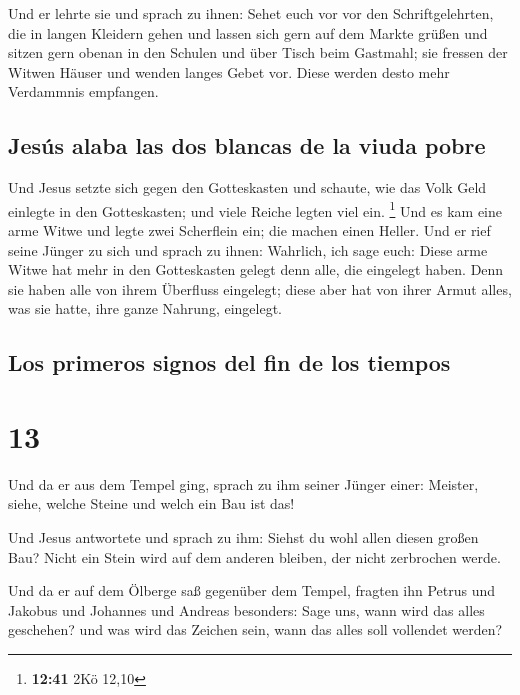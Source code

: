  Und er lehrte sie und sprach zu ihnen: Sehet euch vor
vor den Schriftgelehrten, die in langen Kleidern gehen und lassen sich
gern auf dem Markte grüßen  und sitzen gern obenan in den
Schulen und über Tisch beim Gastmahl;  sie fressen der
Witwen Häuser und wenden langes Gebet vor. Diese werden desto mehr
Verdammnis empfangen.

\hypertarget{jesuxfas-alaba-las-dos-blancas-de-la-viuda-pobre}{%
\subsection{Jesús alaba las dos blancas de la viuda
pobre}\label{jesuxfas-alaba-las-dos-blancas-de-la-viuda-pobre}}

 Und Jesus setzte sich gegen den Gotteskasten und
schaute, wie das Volk Geld einlegte in den Gotteskasten; und viele
Reiche legten viel ein. \footnote{\textbf{12:41} 2Kö 12,10}
 Und es kam eine arme Witwe und legte zwei Scherflein
ein; die machen einen Heller.  Und er rief seine Jünger
zu sich und sprach zu ihnen: Wahrlich, ich sage euch: Diese arme Witwe
hat mehr in den Gotteskasten gelegt denn alle, die eingelegt haben.
 Denn sie haben alle von ihrem Überfluss eingelegt; diese
aber hat von ihrer Armut alles, was sie hatte, ihre ganze Nahrung,
eingelegt.

\hypertarget{los-primeros-signos-del-fin-de-los-tiempos}{%
\subsection{Los primeros signos del fin de los
tiempos}\label{los-primeros-signos-del-fin-de-los-tiempos}}

\hypertarget{section-12}{%
\section{13}\label{section-12}}

 Und da er aus dem Tempel ging, sprach zu ihm seiner
Jünger einer: Meister, siehe, welche Steine und welch ein Bau ist das!

 Und Jesus antwortete und sprach zu ihm: Siehst du wohl
allen diesen großen Bau? Nicht ein Stein wird auf dem anderen bleiben,
der nicht zerbrochen werde.

 Und da er auf dem Ölberge saß gegenüber dem Tempel,
fragten ihn Petrus und Jakobus und Johannes und Andreas besonders:
 Sage uns, wann wird das alles geschehen? und was wird das
Zeichen sein, wann das alles soll vollendet werden?

